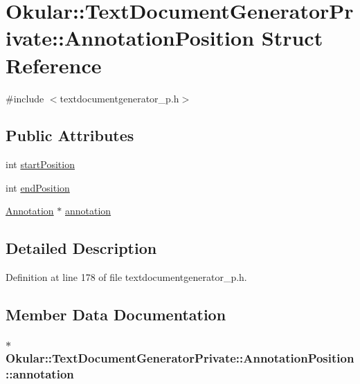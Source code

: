 \hypertarget{structOkular_1_1TextDocumentGeneratorPrivate_1_1AnnotationPosition}{\section{Okular\+:\+:Text\+Document\+Generator\+Private\+:\+:Annotation\+Position Struct Reference}
\label{structOkular_1_1TextDocumentGeneratorPrivate_1_1AnnotationPosition}
}


{\ttfamily \#include $<$textdocumentgenerator\+\_\+p.\+h$>$}

\subsection*{Public Attributes}
\begin{DoxyCompactItemize}
\item 
int \hyperlink{structOkular_1_1TextDocumentGeneratorPrivate_1_1AnnotationPosition_aa8fd3b91acb6195b9341ac9838c28402}{start\+Position}
\item 
int \hyperlink{structOkular_1_1TextDocumentGeneratorPrivate_1_1AnnotationPosition_a772c24061b1b2f5101440b31d2e8e871}{end\+Position}
\item 
\hyperlink{classOkular_1_1Annotation}{Annotation} $\ast$ \hyperlink{structOkular_1_1TextDocumentGeneratorPrivate_1_1AnnotationPosition_af557e1e52655a87adfac85e87a112c94}{annotation}
\end{DoxyCompactItemize}


\subsection{Detailed Description}


Definition at line 178 of file textdocumentgenerator\+\_\+p.\+h.



\subsection{Member Data Documentation}
\hypertarget{structOkular_1_1TextDocumentGeneratorPrivate_1_1AnnotationPosition_af557e1e52655a87adfac85e87a112c94}{
\subsubsection[{annotation}]{$\ast$ Okular\+::\+Text\+Document\+Generator\+Private\+::\+Annotation\+Position\+::annotation}}\label{structOkular_1_1TextDocumentGeneratorPrivate_1_1AnnotationPosition_af557e1e52655a87adfac85e87a112c94}


